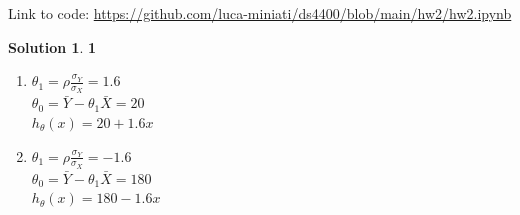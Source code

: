 \documentclass[11pt]{article}
\theoremstyle{definition}
\theoremstyle{nopunct}
\newtheorem*{s}{Solution}
\begin{document}
Link to code: \href{https://github.com/luca-miniati/ds4400/blob/main/hw2/hw2.ipynb}{https://github.com/luca-miniati/ds4400/blob/main/hw2/hw2.ipynb}

\begin{s}\textbf{1}
    \begin{enumerate} 
        \item $\theta_1 = \rho \frac{\sigma_Y}{\sigma_X} = 1.6$ \\
            $\theta_0 = \bar{Y} - \theta_1 \bar{X} = 20$ \\
            $h_{\theta}(x) = 20 + 1.6x$

        \item $\theta_1 = \rho \frac{\sigma_Y}{\sigma_X} = -1.6$ \\
            $\theta_0 = \bar{Y} - \theta_1 \bar{X} = 180$ \\
            $h_{\theta}(x) = 180 - 1.6x$
    \end{enumerate} 
\end{s}

\vspace{10pt}
\end{document}
